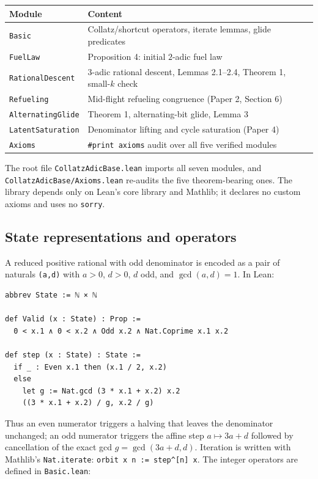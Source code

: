 \documentclass[11pt,a4paper]{article}
\begin{document}
\begin{center}
\begin{tabular}{@{}ll@{}}
\toprule
Module & Content \\
\midrule
\texttt{Basic} & Collatz/shortcut operators, iterate lemmas, glide predicates \\
\texttt{FuelLaw} & Proposition 4: initial $2$-adic fuel law \\
\texttt{RationalDescent} & $3$-adic rational descent, Lemmas 2.1--2.4, Theorem 1, small-$k$ check \\
\texttt{Refueling} & Mid-flight refueling congruence (Paper 2, Section 6) \\
\texttt{AlternatingGlide} & Theorem 1, alternating-bit glide, Lemma 3 \\
\texttt{LatentSaturation} & Denominator lifting and cycle saturation (Paper 4) \\
\texttt{Axioms} & \texttt{\#print axioms} audit over all five verified modules \\
\bottomrule
\end{tabular}
\end{center}

\noindent The root file \texttt{CollatzAdicBase.lean} imports all seven modules,
and \texttt{CollatzAdicBase/Axioms.lean} re-audits the five
theorem-bearing ones.
The library depends only on Lean's core library and Mathlib; it declares no
custom axioms and uses no \texttt{sorry}.

\subsection{State representations and operators}

A reduced positive rational with odd denominator is encoded as a pair of
naturals \texttt{(a,d)} with $a>0$, $d>0$, $d$ odd, and $\gcd(a,d)=1$.  In Lean:

\begin{lstlisting}
abbrev State := ℕ × ℕ

def Valid (x : State) : Prop :=
  0 < x.1 ∧ 0 < x.2 ∧ Odd x.2 ∧ Nat.Coprime x.1 x.2

def step (x : State) : State :=
  if _ : Even x.1 then (x.1 / 2, x.2)
  else
    let g := Nat.gcd (3 * x.1 + x.2) x.2
    ((3 * x.1 + x.2) / g, x.2 / g)
\end{lstlisting}

\noindent Thus an even numerator triggers a halving that leaves the denominator
unchanged; an odd numerator triggers the affine step $a\mapsto 3a+d$ followed by
cancellation of the exact gcd $g=\gcd(3a+d,d)$.  Iteration is written with
Mathlib's \texttt{Nat.iterate}: \texttt{orbit x n := step\textasciicircum[n] x}.  The integer
operators are defined in \texttt{Basic.lean}:
\end{document}
